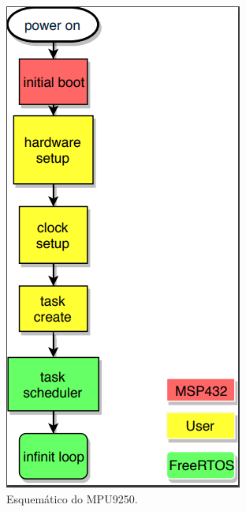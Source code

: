 \begin{apendicesenv}
\begin{figure}[!h]
	\centerfloat
	\centering
	\includegraphics[keepaspectratio=true,scale=0.5]{figuras/flowChart_obc.PNG}
	\caption{Esquemático do MPU9250.}
	\label{flowChart_obc}
\end{figure}


\end{apendicesenv}
